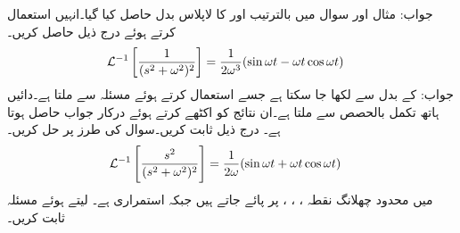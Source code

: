 جواب:
مثال  اور سوال  میں بالترتیب  اور  کا لاپلاس بدل حاصل کیا گیا۔انہیں استعمال کرتے ہوئے درج ذیل حاصل کریں۔
\begin{align}
\mathcal{L}^{-1}\left[\frac{1}{(s^2+\omega^2)^2}\right]&=\frac{1}{2\omega^3}(\sin \omega t-\omega t \cos \omega t)
\end{align}
جواب: کے بدل سے  لکھا جا سکتا ہے جسے استعمال کرتے ہوئے مسئلہ  سے  ملتا ہے۔دائیں ہاتھ تکمل بالحصص سے  ملتا ہے۔ان نتائج کو اکٹھے کرتے ہوئے درکار جواب حاصل ہوتا ہے۔
درج ذیل ثابت کریں۔سوال  کی طرز پر حل کریں۔
\begin{align}
\mathcal{L}^{-1}\left[\frac{s^2}{(s^2+\omega^2)^2}\right]&=\frac{1}{2\omega}(\sin \omega t+\omega t\cos \omega t)
\end{align}
 میں محدود چھلانگ نقطہ ، ، ،  پر پائے جاتے ہیں جبکہ  استمراری ہے۔    لیتے ہوئے  مسئلہ  ثابت کریں۔  

